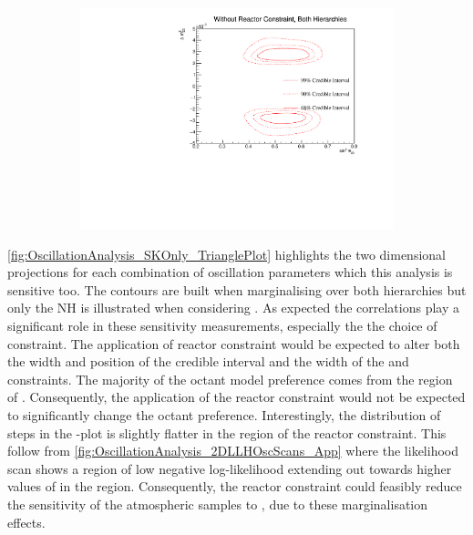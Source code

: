 \begin{figure}[h]
  \begin{subfigure}[t]{1.0\textwidth}
    \includegraphics[width=\textwidth, trim={0mm 0mm 0mm 0mm}, clip,page=1]{Figures/OA/SKOnlyFit/Contours_2D_th23_dm32_BH_0_woRC_UnSmeared_CredibleInterval.pdf}
  \end{subfigure}
  \caption{}
  \label{fig:OscillationAnalysis_SKOnly_DM32TH23}
\end{figure}

\autoref{fig:OscillationAnalysis_SKOnly_TrianglePlot} highlights the two dimensional projections for each combination of oscillation parameters which this analysis is sensitive too. The contours are built when marginalising over both hierarchies but only the NH is illustrated when considering \delmsqatm. As expected the correlations play a significant role in these sensitivity measurements, especially the the choice of \sinsqreac constraint. The application of reactor constraint would be expected to alter both the width and position of the \delmsqatm credible interval and the width of the \dcp and \sinsqatm constraints. The majority of the octant model preference comes from the region of . Consequently, the application of the reactor constraint would not be expected to significantly change the octant preference. Interestingly, the distribution of steps in the \dcp-\sinsqreac plot is slightly flatter in the region of the reactor constraint. This follow from \autoref{fig:OscillationAnalysis_2DLLHOscScans_App} where the likelihood scan shows a region of low negative log-likelihood extending out towards higher values of \sinsqreac in the  region. Consequently, the reactor constraint could feasibly reduce the sensitivity of the atmospheric samples to \dcp, due to these marginalisation effects. 

